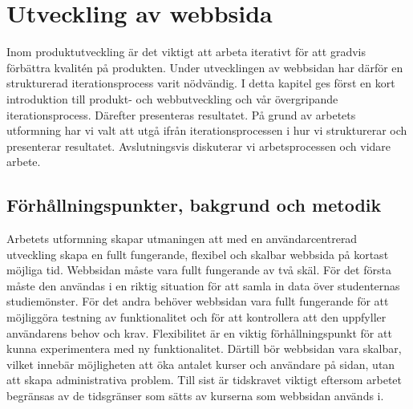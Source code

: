 \chapter{Utveckling av webbsida}
\label{sec: webb}

Inom produktutveckling är det viktigt att arbeta iterativt för att gradvis förbättra kvalitén på produkten. Under utvecklingen av webbsidan har därför en strukturerad iterationsprocess varit nödvändig. I detta kapitel ges först en kort introduktion till produkt- och webbutveckling och vår övergripande iterationsprocess. Därefter presenteras resultatet. På grund av arbetets utformning har vi valt att utgå ifrån iterationsprocessen i hur vi strukturerar och presenterar resultatet. Avslutningsvis diskuterar vi arbetsprocessen och vidare arbete. 


\section{Förhållningspunkter, bakgrund och metodik}
Arbetets utformning skapar utmaningen att med en användarcentrerad utveckling skapa en fullt fungerande, flexibel och skalbar webbsida på kortast möjliga tid. Webbsidan måste vara fullt fungerande av två skäl. För det första måste den användas i en riktig situation för att samla in data över studenternas studiemönster. För det andra behöver webbsidan vara fullt fungerande för att möjliggöra testning av funktionalitet och för att kontrollera att den uppfyller användarens behov och krav. Flexibilitet är en viktig förhållningspunkt för att kunna experimentera med ny funktionalitet. Därtill bör webbsidan vara skalbar, vilket innebär möjligheten att öka antalet kurser och användare på sidan, utan att skapa administrativa problem. Till sist är tidskravet viktigt eftersom arbetet begränsas av de tidsgränser som sätts av kurserna som webbsidan används i.


